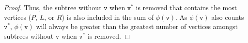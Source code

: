 \documentclass[11pt]{scrartcl}
\theoremstyle{dotlessP}
\theoremstyle{dotlessN}
\begin{document}
\begin{ans}
\begin{proof}
		Thus, the subtree without $\texttt{v}$ when $\texttt{v}^*$ is removed that contains the most vertices ($P$, $L$, or $R$) is also included in the sum of $\phi(\texttt{v})$. As $\phi(\texttt{v})$ also counts $\texttt{v}^*$, $\phi(\texttt{v})$ will always be greater than the greatest number of vertices amongst subtrees without $\texttt{v}$ when $\texttt{v}^*$ is removed.
	\end{proof}
% 
% 
% 			
% 
% 
\end{ans}
\end{document}
